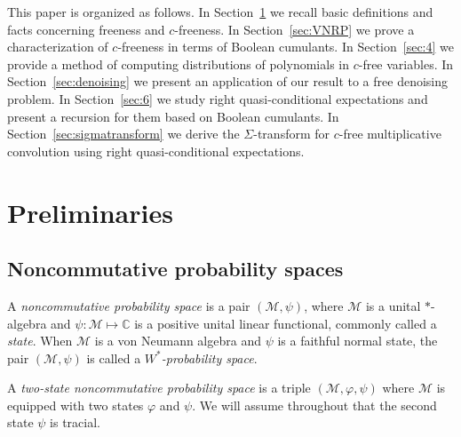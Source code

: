\documentclass[12pt]{amsart}
\newcommand\IC{{\mathbb C}}
\newcommand{\alg}[1]{\mathcal{#1}}
\theoremstyle{definition}
\numberwithin{equation}{section}
\begin{document}
This paper is organized as follows. In Section~\ref{sec:2} we recall basic definitions and facts concerning freeness and $c$-freeness. In Section~\ref{sec:VNRP} we prove a characterization of $c$-freeness in terms of Boolean cumulants. In Section~\ref{sec:4} we provide a method of computing distributions of polynomials in $c$-free variables. In Section~\ref{sec:denoising} we present an application of our result to a free denoising problem. In Section~\ref{sec:6} we study right quasi-conditional expectations and present a recursion for them based on Boolean cumulants. In Section~\ref{sec:sigmatransform} we derive the $\Sigma$-transform for $c$-free multiplicative convolution using  right quasi-conditional expectations.

\section{Preliminaries}\label{sec:2}
\subsection{Noncommutative probability spaces}
A \emph{noncommutative probability space} is a pair
 $(\alg{M},\psi)$, where $\alg{M}$ is a unital $*$-algebra and
$\psi:\alg{M}\mapsto\IC$ is a positive unital linear functional, commonly
called a \emph{state}. When $\alg{M}$ is a von Neumann algebra and $\psi$ is a
faithful normal state, the pair  $(\alg{M},\psi)$ is  called  a \emph{$W^*$-probability space}.

A \emph{two-state noncommutative probability space} is a triple
$(\alg{M},\varphi,\psi)$ where $\alg{M}$ is equipped with
two states $\varphi$ and $\psi$.
We will assume throughout that the second state $\psi$ is tracial.
\end{document}
